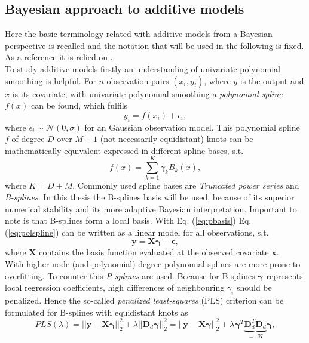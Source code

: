 \documentclass[12pt,letterpaper]{article}
\numberwithin{equation}{subsection}
\begin{document}
\subsection{Bayesian approach to additive models}
Here the basic terminology related with additive models from a Bayesian perspective is recalled and the notation that will be used in the following is fixed. As a reference it is relied on \cite{bayessm}. \\
To study additive models firstly an understanding of univariate polynomial smoothing is helpful. For $n$ observation-pairs $(x_i, y_i)$, where $y$ is the output and $x$ is its covariate, with univariate polynomial smoothing a \textit{polynomial spline} $f(x)$ can be found, which fulfils 
\begin{equation}
y_i = f(x_i) + \epsilon_i,
\label{eq:polspline}
\end{equation}
where $\epsilon_i \sim \mathcal{N}(0,\sigma)$ for an Gaussian observation model. This polynomial spline $f$ of degree $D$ over $M+1$ (not necessarily equidistant) knots can be mathematically equivalent expressed in different spline bases, s.t.  
\begin{equation}
f(x) = \sum^K_{k=1}\gamma_k B_k(x),
\label{eq:pbasis}
\end{equation}
where $K = D + M.$
Commonly used spline bases are \textit{Truncated power series} and \textit{B-splines}. In this thesis the B-splines basis will be used, because of its superior numerical stability and its more adaptive Bayesian interpretation. Important to note is that B-splines form a local basis. With Eq. (\ref{eq:pbasis}) Eq. (\ref{eq:polspline}) can be written as a linear model for all observations, s.t.
\begin{equation}
\mathbf{y} = \mathbf{X} \mathbf{ \gamma } + \mathbf{\epsilon},
\end{equation}
where $\mathbf{X}$ contains the basis function evaluated at the observed covariate $\mathbf{x}$. \\
With higher node (and polynomial) degree polynomial splines are more prone to overfitting. To counter this \textit{P-splines} are used. Because for B-splines $\mathbf{\gamma}$ represents local regression coefficients, high differences of neighbouring $\gamma_i$ should be penalized. Hence the so-called \textit{penalized least-squares} (PLS) criterion can be formulated for B-splines with equidistant knots as
\begin{equation}
PLS(\lambda) = ||\mathbf{y} - \mathbf{X}\mathbf{\gamma}||^2_2 +
 \lambda||\mathbf{D}_d\mathbf{\gamma}||^2_2 = ||\mathbf{y} - \mathbf{X}\mathbf{\gamma}||^2_2 +  \lambda\mathbf{\gamma}^T\underbrace{\mathbf{D}_d^T\mathbf{D}_d}_{=:\mathbf{K}}\mathbf{\gamma},
\end{equation}
\end{document}
